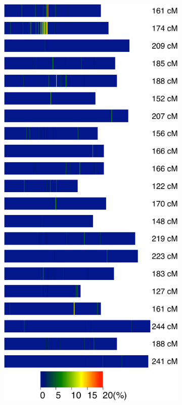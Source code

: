 \begin{figure}
\begin{subfigure}{0.4\textwidth}
	\end{subfigure}
	~
	\begin{subfigure}{0.45\textwidth}
	\caption{}
	\label{fig:yr15:bfr6}
	\includegraphics[height=0.55\textheight]{Yr15/Figures/mapping/snpsBFR6.pdf}

\end{subfigure}
\end{figure}
